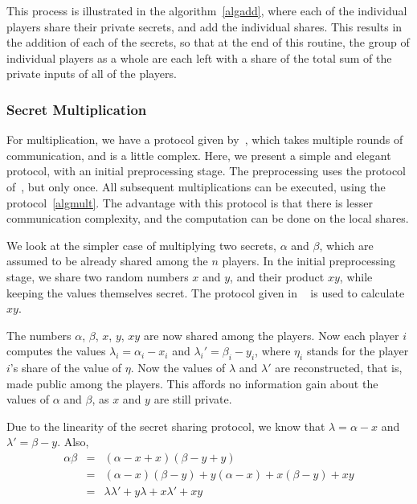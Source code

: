 This process is illustrated in the algorithm~\ref{algadd}, 
where each of the
individual players share their private secrets, 
and add the individual shares.
This results in the addition of each of the secrets, 
so that at the end of this
routine, the group of individual players as a whole are 
each left with a share of
the total sum of the private inputs of all of the players.

\subsubsection{Secret Multiplication}
\label{sec:mult-prim}

For multiplication, we have a protocol given 
by~\cite{GRR98:SVFMCwAtTC}, which takes multiple rounds 
of communication, and 
is a little complex. Here, we present a simple and elegant protocol, 
with an initial preprocessing stage. The
preprocessing uses the protocol of~\cite{GRR98:SVFMCwAtTC}, but 
only once. All subsequent multiplications can be executed, using
the protocol~\ref{algmult}. The advantage with this protocol is 
that there is lesser communication complexity, 
and the computation can be done on the local shares.

We look at the simpler case of multiplying two secrets, 
$\alpha$ and $\beta$, 
which are assumed to be already shared among the $n$ players. 
In the initial preprocessing stage, 
we share two random numbers $x$ and $y$, and their product $xy$, 
while keeping the values themselves secret. 
The protocol given in ~\cite{GRR98:SVFMCwAtTC} is used to 
calculate $xy$. 

The numbers $\alpha$, $\beta$, $x$, $y$, $xy$ are now shared 
among the players. Now each player $i$ computes the values 
$\lambda_{i} =  \alpha_{i} - x_{i}$ and 
$\lambda_{i}' = \beta_{i} - y_{i}$, where $\eta_{i}$ stands
for the player $i$'s share of the value of $\eta$. Now the 
    values of $\lambda$ and $\lambda'$ are 
reconstructed, that is, made public among the players. This 
affords no information gain about the values
of $\alpha$ and $\beta$, as $x$ and $y$ are still private. 

Due to the linearity of the secret sharing protocol, we know 
that $\lambda = \alpha - x$ and $\lambda' = \beta - y$.
Also, 
\begin{eqnarray*}	
	\alpha\beta 	& = & (\alpha - x + x)(\beta - y + y) \\
			& = & (\alpha - x)(\beta - y) + y(\alpha - x) + x(\beta - y) + xy \\
			& = & \lambda\lambda' + y\lambda + x\lambda' + xy
\end{eqnarray*}

